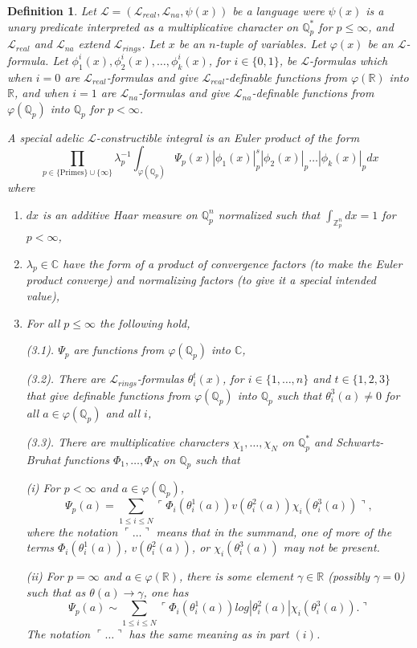 \documentclass[12pt]{amsart}
\def\R{\mathbb{R}}
\def\C{\mathbb{C}}
\def\Z{\mathbb{Z}}
\def\cL{\mathcal{L}}
\def\C{\mathbb{C}}
\def\R{\mathbb{R}}
\def\Q{\mathbb{Q}}
\def\cL{\mathcal{L}}
\newtheorem{Def}{Definition}[section]
\numberwithin{equation}{section}
\begin{document}
\begin{Def}\label{def-sp-ad-con} Let $\cL=(\cL_{real},\cL_{na},\psi(x))$ be a language were $\psi(x)$ is a unary predicate interpreted as a multiplicative character on $\Q_p^*$ for $p\leq \infty$, and 
$\cL_{real}$ and $\cL_{na}$ extend $\cL_{rings}$. Let $x$ be an $n$-tuple of variables. Let $\varphi(x)$ be an $\cL$-formula. 
Let $\phi_1^i(x),\phi_2^i(x),\dots,\phi_k^i(x)$, for $i\in \{0,1\}$, be $\cL$-formulas which when $i=0$ are $\cL_{real}$-formulas and give $\cL_{real}$-definable functions from $\varphi(\R)$ into $\R$, and 
when $i=1$ are $\cL_{na}$-formulas and give $\cL_{na}$-definable functions from $\varphi(\Q_p)$ into $\Q_p$ for $p<\infty$.

A special adelic $\cL$-constructible integral is an Euler product of the form
$$\prod_{p\in \{ \mathrm{Primes}\}\cup \{\infty\}} \lambda_p^{-1}\int_{\varphi(\Q_p)} \Psi_p(x)|\phi_1(x)|^s_p |\phi_2(x)|_p\dots |\phi_k(x)|_p dx$$
where
\begin{enumerate}
\item $dx$ is an additive Haar measure on $\Q_p^n$ normalized such that $\int_{\Z_p^n}dx=1$ for $p<\infty$, 
\item $\lambda_p\in \C$ have the form of a product of convergence factors (to make the Euler product converge) and normalizing factors (to give it a special intended value),
\item For all $p\leq \infty$ the following hold,

(3.1). $\Psi_p$ are functions from $\varphi(\Q_p)$ into $\C$,

(3.2). There are $\cL_{rings}$-formulas $\theta_i^t(x)$, for $i\in \{1,\dots,n\}$ and $t\in \{1,2,3\}$
that give definable functions from $\varphi(\Q_p)$ into $\Q_p$ such that $\theta_i^3(a)\neq 0$ for all $a\in \varphi(\Q_p)$ and all $i$,

(3.3). There are multiplicative characters $\chi_1,\dots,\chi_N$ on $\Q_p^*$ and Schwartz-Bruhat functions $\Phi_1,\dots,\Phi_N$ on $\Q_p$ such that 

(i) For $p<\infty$ and $a\in \varphi(\Q_p)$, 
$$\Psi_p(a)=\sum_{1\leq i\leq N} \ulcorner \Phi_i(\theta_i^1(a)) v(\theta_i^2(a))\chi_i(\theta_i^3(a))\urcorner,$$ 
where the notation $\ulcorner \dots \urcorner$ means that in the summand, one of more of the terms $\Phi_i(\theta_i^1(a))$, $v(\theta_i^2(a))$, or $\chi_i(\theta_i^3(a))$ may not be present.

(ii) For $p=\infty$ and $a\in \varphi(\R)$, there is some element $\gamma \in \R$ (possibly $\gamma=0$) such that as $\theta(a) \rightarrow \gamma$, one has
$$\Psi_p(a)\sim \sum_{1\leq i\leq N} \ulcorner \Phi_i(\theta_i^1(a)) log |\theta_i^2(a)| \chi_i(\theta_i^3(a)).\urcorner$$
The notation $\ulcorner \dots \urcorner$ has the same meaning as in part $(i)$.

\end{enumerate}
\end{Def}
\end{document}
